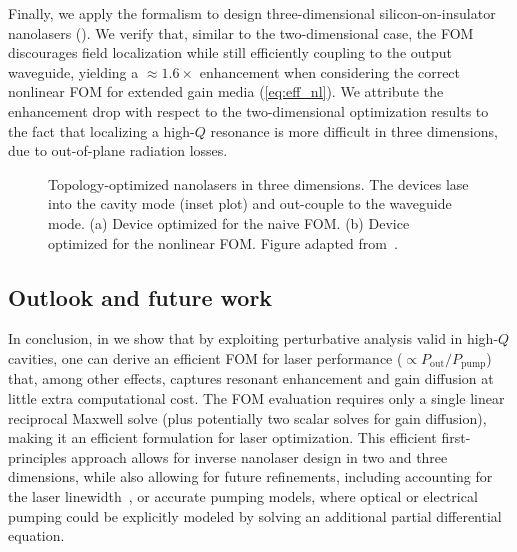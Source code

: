 Finally, we apply the formalism to design three-dimensional silicon-on-insulator nanolasers (). 
We verify that, similar to the two-dimensional case, the FOM discourages field localization while still efficiently coupling to the output waveguide, yielding a $\approx 1.6\times$
enhancement when considering the correct nonlinear FOM for extended gain media (\eqref{eq:eff_nl}). We attribute the enhancement drop with respect to the two-dimensional optimization results to the fact that localizing a high-$Q$ resonance is more difficult in three dimensions, due to out-of-plane radiation losses.

\begin{figure}[tb]
    \centering
    \caption{Topology-optimized nanolasers in three dimensions. The devices lase into the cavity mode (inset plot) and out-couple to the waveguide mode. (a) Device optimized for the naive FOM. (b) Device optimized for the nonlinear FOM.
    Figure adapted from~\cite{ownpub4}.}
    \label{fig:laser3d}
\end{figure}

\subsection*{Outlook and future work}

In conclusion, in \cite{ownpub4} we show that by exploiting perturbative analysis valid in high-$Q$ cavities, one can derive  
an efficient FOM for laser performance ($\propto P_\text{out}/P_\text{pump}$) that, among other effects, captures resonant enhancement and gain diffusion at little extra computational cost. The FOM evaluation requires only a  
single linear reciprocal Maxwell solve (plus potentially two scalar solves for gain diffusion), making it 
an efficient formulation for laser optimization. This efficient first-principles approach allows for inverse nanolaser design in two and three dimensions, while  
also allowing for future refinements, including accounting for the laser linewidth~\cite{pick}, or accurate pumping models, where optical or electrical pumping could be explicitly
modeled by solving an additional partial differential equation.
